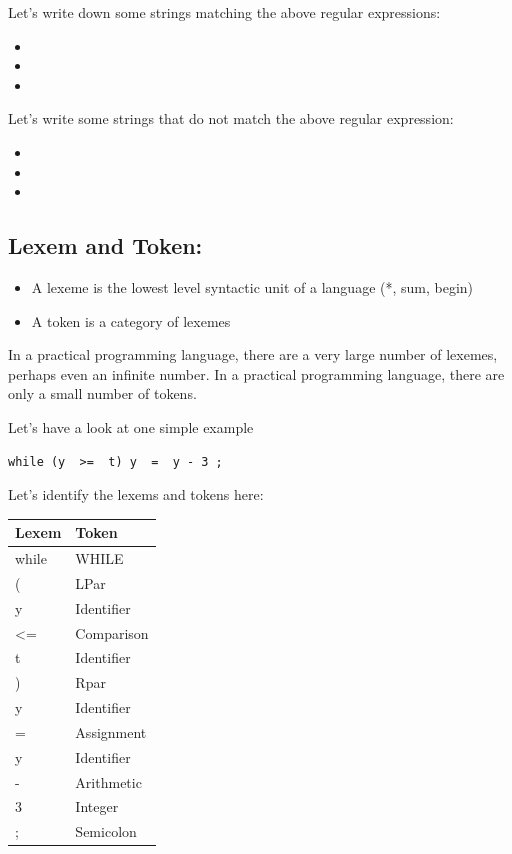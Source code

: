 \documentclass[11pt]{article}
\begin{document}
Let's write down some strings matching the above regular expressions:

\begin{itemize}
\item 

\item 

\item 
\end{itemize}

Let's write some strings that do not match the above regular expression:

\begin{itemize}
\item 

\item 

\item 
\end{itemize}

\subsection{Lexem and Token:}
\label{sec:orgc175f2a}

\begin{itemize}
\item A lexeme is the lowest level syntactic unit of a language (*, sum, begin)

\item A token is a category of lexemes
\end{itemize}

In a practical programming language, there are a very large number of lexemes,
perhaps even an infinite number. In a practical programming language, there are
only a small number of tokens.

Let's have a look at one simple example

\begin{verbatim}
while (y  >=  t) y  =  y - 3 ;
\end{verbatim}

Let's identify the lexems and tokens here:

\begin{center}
\begin{tabular}{ll}
\hline
Lexem & Token\\
\hline
while & WHILE\\
\hline
( & LPar\\
\hline
y & Identifier\\
\hline
<= & Comparison\\
\hline
t & Identifier\\
\hline
) & Rpar\\
\hline
y & Identifier\\
\hline
= & Assignment\\
\hline
y & Identifier\\
\hline
- & Arithmetic\\
\hline
3 & Integer\\
\hline
; & Semicolon\\
\hline
\end{tabular}
\end{center}
\end{document}

